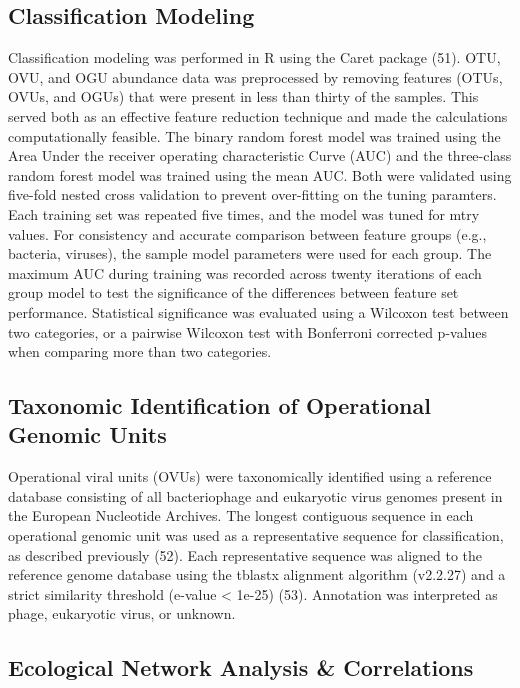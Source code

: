 \documentclass[12pt,]{article}
\begin{document}
\subsection{Classification Modeling}\label{classification-modeling}

Classification modeling was performed in R using the Caret package (51).
OTU, OVU, and OGU abundance data was preprocessed by removing features
(OTUs, OVUs, and OGUs) that were present in less than thirty of the
samples. This served both as an effective feature reduction technique
and made the calculations computationally feasible. The binary random
forest model was trained using the Area Under the receiver operating
characteristic Curve (AUC) and the three-class random forest model was
trained using the mean AUC. Both were validated using five-fold nested
cross validation to prevent over-fitting on the tuning paramters. Each
training set was repeated five times, and the model was tuned for mtry
values. For consistency and accurate comparison between feature groups
(e.g., bacteria, viruses), the sample model parameters were used for
each group. The maximum AUC during training was recorded across twenty
iterations of each group model to test the significance of the
differences between feature set performance. Statistical significance
was evaluated using a Wilcoxon test between two categories, or a
pairwise Wilcoxon test with Bonferroni corrected p-values when comparing
more than two categories.

\subsection{Taxonomic Identification of Operational Genomic
Units}\label{taxonomic-identification-of-operational-genomic-units}

Operational viral units (OVUs) were taxonomically identified using a
reference database consisting of all bacteriophage and eukaryotic virus
genomes present in the European Nucleotide Archives. The longest
contiguous sequence in each operational genomic unit was used as a
representative sequence for classification, as described previously
(52). Each representative sequence was aligned to the reference genome
database using the tblastx alignment algorithm (v2.2.27) and a strict
similarity threshold (e-value \textless{} 1e-25) (53). Annotation was
interpreted as phage, eukaryotic virus, or unknown.

\subsection{Ecological Network Analysis \&
Correlations}\label{ecological-network-analysis-correlations}
\end{document}
